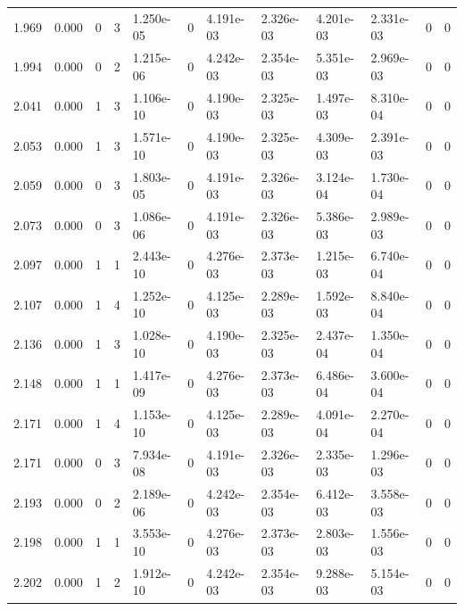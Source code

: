 \documentclass[preview]{standalone}
\begin{document}
{{{\begin{tabular}{L{1.2cm}C{1.2cm} C{0.3cm}C{0.5cm} C{1.4cm}C{1.4cm} C{1.4cm}C{1.4cm} C{1.6cm}C{1.6cm} C{1.6cm}C{1.6cm}}
  1.969  &  0.000  & 0     &  3 &  1.250e-05  & 0  &  4.191e-03&   2.326e-03& 4.201e-03 & 2.331e-03   &  0 & 0  \\ 
  1.994  &  0.000  & 0     &  2 &  1.215e-06  & 0  &  4.242e-03&   2.354e-03& 5.351e-03 & 2.969e-03   &  0 & 0  \\ 
  2.041  &  0.000  & 1     &  3 &  1.106e-10  & 0  &  4.190e-03&   2.325e-03& 1.497e-03 & 8.310e-04   &  0 & 0  \\ 
  2.053  &  0.000  & 1     &  3 &  1.571e-10  & 0  &  4.190e-03&   2.325e-03& 4.309e-03 & 2.391e-03   &  0 & 0  \\ 
  2.059  &  0.000  & 0     &  3 &  1.803e-05  & 0  &  4.191e-03&   2.326e-03& 3.124e-04 & 1.730e-04   &  0 & 0  \\ 
  2.073  &  0.000  & 0     &  3 &  1.086e-06  & 0  &  4.191e-03&   2.326e-03& 5.386e-03 & 2.989e-03   &  0 & 0  \\ 
  2.097  &  0.000  & 1     &  1 &  2.443e-10  & 0  &  4.276e-03&   2.373e-03& 1.215e-03 & 6.740e-04   &  0 & 0  \\ 
  2.107  &  0.000  & 1     &  4 &  1.252e-10  & 0  &  4.125e-03&   2.289e-03& 1.592e-03 & 8.840e-04   &  0 & 0  \\ 
  2.136  &  0.000  & 1     &  3 &  1.028e-10  & 0  &  4.190e-03&   2.325e-03& 2.437e-04 & 1.350e-04   &  0 & 0  \\ 
  2.148  &  0.000  & 1     &  1 &  1.417e-09  & 0  &  4.276e-03&   2.373e-03& 6.486e-04 & 3.600e-04   &  0 & 0  \\ 
  2.171  &  0.000  & 1     &  4 &  1.153e-10  & 0  &  4.125e-03&   2.289e-03& 4.091e-04 & 2.270e-04   &  0 & 0  \\ 
  2.171  &  0.000  & 0     &  3 &  7.934e-08  & 0  &  4.191e-03&   2.326e-03& 2.335e-03 & 1.296e-03   &  0 & 0  \\ 
  2.193  &  0.000  & 0     &  2 &  2.189e-06  & 0  &  4.242e-03&   2.354e-03& 6.412e-03 & 3.558e-03   &  0 & 0  \\ 
  2.198  &  0.000  & 1     &  1 &  3.553e-10  & 0  &  4.276e-03&   2.373e-03& 2.803e-03 & 1.556e-03   &  0 & 0  \\ 
  2.202  &  0.000  & 1     &  2 &  1.912e-10  & 0  &  4.242e-03&   2.354e-03& 9.288e-03 & 5.154e-03   &  0 & 0  \\ 
\hline 
\end{tabular} 

}}}
\end{document}
